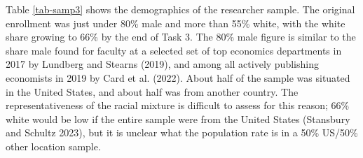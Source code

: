 \documentclass[
  letterpaper,
  DIV=11,
  numbers=noendperiod]{scrartcl}
\begin{document}
Table \ref{tab-samp3} shows the demographics of the researcher sample.
The original enrollment was just under 80\% male and more than 55\%
white, with the white share growing to 66\% by the end of Task 3. The
80\% male figure is similar to the share male found for faculty at a
selected set of top economics departments in 2017 by Lundberg and
Stearns (2019), and among all actively publishing economists in 2019 by
Card et al. (2022). About half of the sample was situated in the United
States, and about half was from another country. The representativeness
of the racial mixture is difficult to assess for this reason; 66\% white
would be low if the entire sample were from the United States (Stansbury
and Schultz 2023), but it is unclear what the population rate is in a
50\% US/50\% other location sample.

\begin{table}[!htbp] \centering \renewcommand*{\arraystretch}{1.1}\caption{Researcher Demographics}
\end{table}
\end{document}
